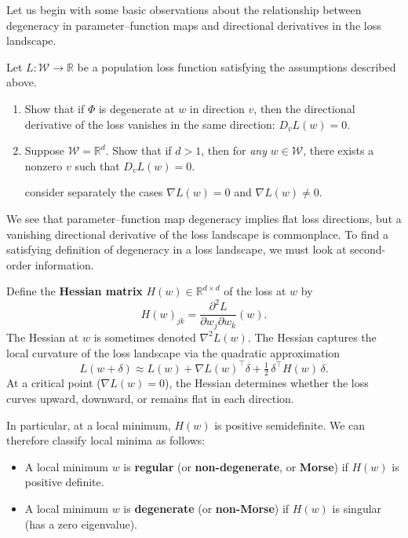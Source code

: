 \documentclass[11pt]{article}
\newcommand{\R}{\mathbb{R}}
\newcommand{\W}{\mathcal{W}}
\begin{document}
Let us begin with some basic observations about the relationship between degeneracy
in parameter--function maps and directional derivatives in the loss landscape.

\begin{exercise}
\label{ex:loss-basic}
Let $L : \W \to \R$ be a population loss function satisfying the assumptions described above.
\begin{enumerate}
    \item
        Show that if $\Phi$ is degenerate at $w$ in direction $v$, then the
        directional derivative of the loss vanishes in the same direction:
        $D_v L(w) = 0$.
    \item
        Suppose $\W = \R^d$. Show that if $d > 1$, then for \emph{any} $w \in \W$, there exists a nonzero $v$
        such that $D_v L(w) = 0$. \begin{hint}
consider separately the cases $\nabla
        L(w) = 0$ and $\nabla L(w) \neq 0$.
        \end{hint}
\end{enumerate}
\end{exercise}

We see that parameter--function map degeneracy implies flat loss directions,
but a vanishing directional derivative of the loss landscape is commonplace. To
find a satisfying definition of degeneracy in a loss landscape, we must look at
second-order information.

Define the \textbf{Hessian matrix} $H(w) \in \R^{d \times d}$ of the loss at
$w$ by
\begin{equation}
    H(w)_{jk} = \frac{\partial^2 L}{\partial w_j \partial w_k}(w).
\end{equation}
The Hessian at $w$ is sometimes denoted $\nabla^2 L(w)$.
The Hessian captures the local curvature of the loss landscape via the
quadratic approximation
\begin{equation}
    L(w + \delta)
    \approx L(w)
    + \nabla L(w)^\top \delta
    + \tfrac{1}{2}\,\delta^\top H(w)\, \delta.
\end{equation}
At a critical point ($\nabla L(w) = 0$), the Hessian determines whether the
loss curves upward, downward, or remains flat in each direction.

In particular, at a local minimum, $H(w)$ is positive semidefinite. We can
therefore classify local minima as follows:
\begin{itemize}
    \item A local minimum $w$ is \textbf{regular} (or \textbf{non-degenerate},
        or \textbf{Morse}) if $H(w)$ is positive definite.
    \item A local minimum $w$ is \textbf{degenerate} (or \textbf{non-Morse}) if
        $H(w)$ is singular (has a zero eigenvalue).
\end{itemize}
\end{document}
